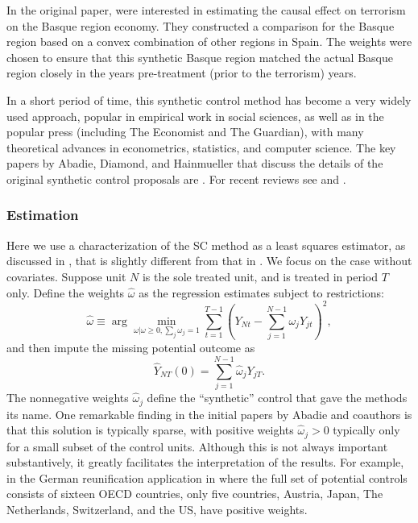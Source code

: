 \documentclass[letterpaper,12pt,leqno]{article}
\begin{document}
In the original paper, \citep{abadie2003} were interested in estimating the causal effect on terrorism on the Basque region economy. They constructed a comparison for the Basque region based on a convex combination of other regions in Spain. The weights were chosen to ensure that this synthetic Basque region matched the actual Basque region closely in the years pre-treatment (prior to the terrorism) years.

In a short period of time, this synthetic control method has become a very widely used approach, popular in empirical work in social sciences, as well as in the popular press (including The Economist and The Guardian), with many theoretical advances in econometrics, statistics, and computer science. The key papers by Abadie, Diamond, and Hainmueller that discuss the details of the original synthetic control proposals are  \citep*{abadie2010synthetic, abadie2014}. For  recent reviews see \citep{abadie2019using} and \citep{samartsidis2019assessing}.

\subsubsection{Estimation}

Here we use a  characterization of the SC method as a least squares estimator, as discussed in
 \citep{doudchenko2016balancing}, that is slightly different from that in  \citep*{abadie2010synthetic}. 
We   focus on the case without covariates. 
 Suppose unit $N$ is the sole treated unit, and is treated in period $T$ only. Define the weights $\hat\omega$ as the regression estimates subject to restrictions:
 \begin{equation}\label{eq:sc}\hat\omega\equiv \arg\min_{\omega|\omega\geq 0,\sum_j\omega_j=1}\sum_{t=1}^{T-1} \left(Y_{Nt}-\sum_{j=1}^{N-1} \omega_j Y_{jt}\right)^2,\end{equation}
and then impute the missing potential outcome as
\[\hat Y_{NT}(0)=\sum_{j=1}^{N-1} \hat\omega_j Y_{jT}.\]
The nonnegative weights $\hat\omega_j$ define the ``synthetic'' control that gave the methods its name.
One remarkable finding in the initial papers by Abadie and coauthors is that this solution is typically sparse, with positive weights $\hat\omega_j>0$ typically only for a small subset of the control units. Although this is not always important substantively, it greatly facilitates the interpretation of the results. For example, in the German reunification application in \citep{abadie2014} where the full set of potential controls consists of sixteen OECD countries, only five countries, Austria, Japan, The Netherlands, Switzerland, and the US, have positive weights.
\end{document}
